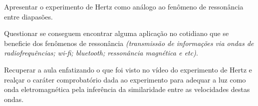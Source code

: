     \vspace*{10pt}

    Apresentar o experimento de Hertz como análogo ao fenômeno de ressonância entre diapasões.

    Questionar se conseguem encontrar alguma aplicação no cotidiano que se beneficie dos fenômenos de ressonância \emph{(transmissão de informações via ondas de radiofrequências; wi-fi; bluetooth; ressonância magnética e etc)}.

    Recuperar a aula enfatizando o que foi visto no vídeo do experimento de Hertz e realçar o caráter comprobatório dada ao experimento para adequar a luz como onda eletromagnética pela inferência da similaridade entre as velocidades destas ondas.
    


